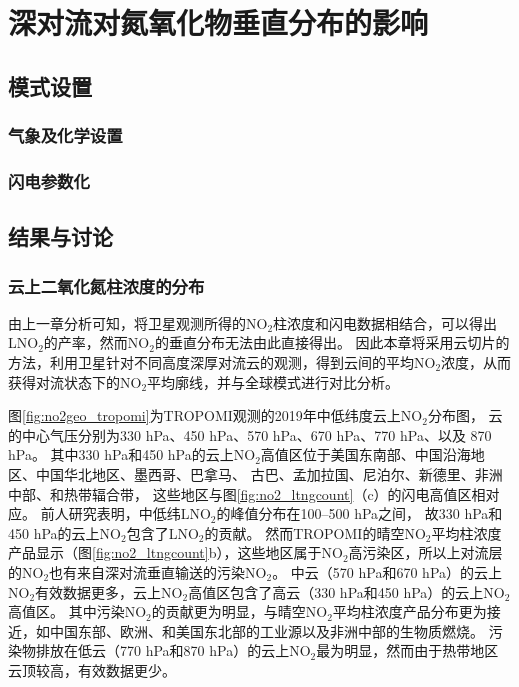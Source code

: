 
\chapter{深对流对氮氧化物垂直分布的影响}

\section{模式设置}

\subsection{气象及化学设置}

\subsection{闪电参数化}



\section{结果与讨论}

\subsection{云上二氧化氮柱浓度的分布}

由上一章分析可知，将卫星观测所得的NO$_2$柱浓度和闪电数据相结合，可以得出LNO$_2$的产率，然而NO$_2$的垂直分布无法由此直接得出。
因此本章将采用云切片的方法，利用卫星针对不同高度深厚对流云的观测，得到云间的平均NO$_2$浓度，从而获得对流状态下的NO$_2$平均廓线，并与全球模式进行对比分析。

图\ref{fig:no2geo_tropomi}为TROPOMI观测的2019年中低纬度云上NO$_2$分布图，
云的中心气压分别为330 hPa、450 hPa、570 hPa、670 hPa、770 hPa、以及 870 hPa。
其中330 hPa和450 hPa的云上NO$_2$高值区位于美国东南部、中国沿海地区、中国华北地区、墨西哥、巴拿马、
古巴、孟加拉国、尼泊尔、新德里、非洲中部、和热带辐合带，
这些地区与图\ref{fig:no2_ltngcount}（c）的闪电高值区相对应。
前人研究表明，中低纬LNO$_2$的峰值分布在100--500 hPa之间\citep{Pickering.1988,Ott.2010,Luo.2017}，
故330 hPa和450 hPa的云上NO$_2$包含了LNO$_2$的贡献。
然而TROPOMI的晴空NO$_2$平均柱浓度产品显示（图\ref{fig:no2_ltngcount}b），这些地区属于NO$_2$高污染区，所以上对流层的NO$_2$也有来自深对流垂直输送的污染NO$_2$。
中云（570 hPa和670 hPa）的云上NO$_2$有效数据更多，云上NO$_2$高值区包含了高云（330 hPa和450 hPa）的云上NO$_2$高值区。
其中污染NO$_2$的贡献更为明显，与晴空NO$_2$平均柱浓度产品分布更为接近，如中国东部、欧洲、和美国东北部的工业源以及非洲中部的生物质燃烧。
污染物排放在低云（770 hPa和870 hPa）的云上NO$_2$最为明显，然而由于热带地区云顶较高，有效数据更少。


